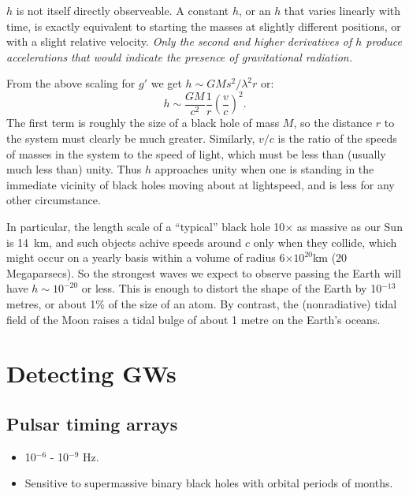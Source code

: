 \documentclass[11pt,a4paper]{article}
\begin{document}
$h$ is not itself directly observeable. A constant $h$, or an $h$ that
varies linearly with time, is exactly equivalent to starting the
masses at slightly different positions, or with a slight relative
velocity. {\it Only the second and higher derivatives of $h$ produce
accelerations that would indicate the presence of gravitational
radiation.}

From the above scaling for $g'$ we get $h \sim GMs^2/ \lambda^{2} r$
or:
\begin{equation}
h \sim \frac{GM}{c^2}\frac{1}{r}(\frac{v}{c})^2 .
\end{equation}
The first term is roughly the size of a black hole of mass $M$, so the
distance $r$ to the system must clearly be much greater. Similarly, $v/c$ 
is the ratio of the speeds of masses in the system to the speed of
light, which must be less than (usually much less than) unity. Thus $h$ 
approaches unity when one is standing in the immediate vicinity of
black holes moving about at lightspeed, and is less for any other
circumstance.

In particular, the length scale of a ``typical'' black hole 10$\times$
as massive as our Sun is 14~km, and such objects achive speeds around $c$ 
only when they collide, which might occur on a yearly basis within a
volume of radius 6$\times10^{20}$km (20 Megaparsecs). So the strongest
waves we expect to observe passing the Earth will have $h\sim
10^{-20}$ or less. This is enough to distort the shape of the Earth by
10$^{-13}$ metres, or about 1\% of the size of an atom. By contrast,
the (nonradiative) tidal field of the Moon raises a tidal bulge of
about 1 metre on the Earth's oceans.
 


\newpage
\section{Detecting GWs}

\subsection{Pulsar timing arrays }
\begin{itemize}
\item  10$^{-6}$ - 10$^{-9}$ Hz. 
\item  Sensitive to supermassive binary black holes with orbital periods of months. 
\end{itemize}
\end{document}
